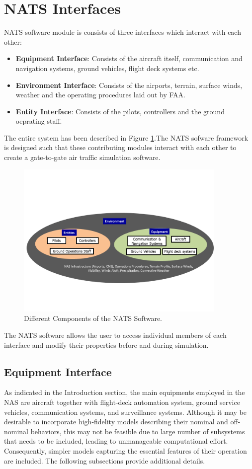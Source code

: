 \documentclass[11pt]{book}              %
\newcommand{\Fig}[1]{Figure \ref{#1}}
\begin{document}
\section{NATS Interfaces}
NATS software module is consists of three interfaces which interact with each other: 
\begin{itemize}
\item \textbf{Equipment Interface}: Consists of the aircraft itself, communication and navigation systems, ground vehicles, flight deck systems etc.
\item \textbf{Environment Interface}: Consists of the airports, terrain, surface winds, weather and the operating procedures laid out by FAA. 
\item \textbf{Entity Interface}: Consists of the pilots, controllers and the ground oeprating staff.
\end{itemize}
The entire system has been described in \Fig{fig:natsinterfaces}.The NATS sofware framework is designed such that these contributing modules interact with each other to create a gate-to-gate air traffic simulation software. 
\begin{figure}[H]
\includegraphics[width=0.9\textwidth]{Pictures/Slide1.PNG}
\caption{Different Components of the NATS Software.\label{fig:natsinterfaces}}
\end{figure}
The NATS software allows the user to access individual members of each interface and modify their properties before and during simulation.
\subsection{Equipment Interface}
As indicated in the Introduction section, the main equipments employed in the NAS are aircraft together with flight-deck automation system, ground service vehicles, communication systems, and surveillance systems. Although it may be desirable to incorporate high-fidelity models
describing their nominal and off-nominal behaviors, this may not be feasible due to large number of subsystems that needs to be included, leading to unmanageable computational effort. Consequently, simpler models capturing the essential features of their operation are included. The following subsections provide additional details.
\end{document}
